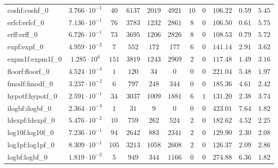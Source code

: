 \begin{tabular}{|l|c|c|c|c|c|c|c|c|c|c|}
coshf:coshf\_0               & $ 3.766 \cdot 10^{-1} $ & $ 40     $ & $ 6137   $ & $ 2019  $ & $ 4921  $ & $ 10  $ & $ 0 $ & $ 106.22      $ & $ 0.59    $ & $ 5.45    $ \\
erfcf:erfcf\_0               & $ 7.136 \cdot 10^{-1} $ & $ 76     $ & $ 3783   $ & $ 1232  $ & $ 2861  $ & $ 8   $ & $ 0 $ & $ 106.50      $ & $ 0.61    $ & $ 5.75    $ \\
erff:erff\_0                 & $ 6.726 \cdot 10^{-1} $ & $ 73     $ & $ 3695   $ & $ 1206  $ & $ 2826  $ & $ 8   $ & $ 0 $ & $ 108.53      $ & $ 0.79    $ & $ 5.72    $ \\
expf:expf\_0                 & $ 4.959 \cdot 10^{-2} $ & $ 7      $ & $ 552    $ & $ 172   $ & $ 177   $ & $ 6   $ & $ 0 $ & $ 141.14      $ & $ 2.91    $ & $ 3.62    $ \\
expm1f:expm1f\_0             & $ 1.285 \cdot 10^{0}  $ & $ 151    $ & $ 3819   $ & $ 1243  $ & $ 2969  $ & $ 2   $ & $ 0 $ & $ 117.48      $ & $ 1.49    $ & $ 3.16    $ \\
floorf:floorf\_0             & $ 4.524 \cdot 10^{-3} $ & $ 1      $ & $ 120    $ & $ 34    $ & $ 0     $ & $ 0   $ & $ 0 $ & $ 221.04      $ & $ 5.48    $ & $ 1.97    $ \\
fmodf:fmodf\_0               & $ 3.237 \cdot 10^{-2} $ & $ 6      $ & $ 797    $ & $ 248   $ & $ 344   $ & $ 0   $ & $ 0 $ & $ 185.36      $ & $ 4.61    $ & $ 2.42    $ \\
hypotf:hypotf\_0             & $ 2.591 \cdot 10^{-1} $ & $ 34     $ & $ 3037   $ & $ 1009  $ & $ 1881  $ & $ 6   $ & $ 1 $ & $ 131.20      $ & $ 2.38    $ & $ 3.74    $ \\
ilogbf:ilogbf\_0             & $ 2.364 \cdot 10^{-3} $ & $ 1      $ & $ 31     $ & $ 9     $ & $ 0     $ & $ 0   $ & $ 0 $ & $ 423.01      $ & $ 7.64    $ & $ 1.82    $ \\
ldexpf:ldexpf\_0             & $ 5.476 \cdot 10^{-2} $ & $ 10     $ & $ 759    $ & $ 262   $ & $ 524   $ & $ 2   $ & $ 0 $ & $ 182.62      $ & $ 4.52    $ & $ 2.25    $ \\
log10f:log10f\_0             & $ 7.236 \cdot 10^{-1} $ & $ 94     $ & $ 2642   $ & $ 883   $ & $ 2341  $ & $ 2   $ & $ 0 $ & $ 129.90      $ & $ 2.30    $ & $ 2.08    $ \\
log1pf:log1pf\_0             & $ 8.309 \cdot 10^{-1} $ & $ 105    $ & $ 3213   $ & $ 1058  $ & $ 2608  $ & $ 2   $ & $ 0 $ & $ 126.37      $ & $ 2.09    $ & $ 2.86    $ \\
logbf:logbf\_0               & $ 1.819 \cdot 10^{-2} $ & $ 5      $ & $ 949    $ & $ 344   $ & $ 1166  $ & $ 0   $ & $ 0 $ & $ 274.88      $ & $ 6.36    $ & $ 1.82    $ \\

\end{tabular}
